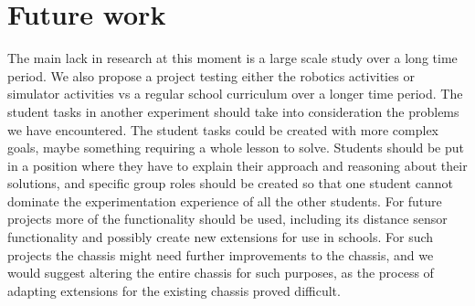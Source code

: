 \section{Future work}
The main lack in research at this moment is a large scale study over a long time period. We also propose a project testing either the robotics activities or simulator activities vs a regular school curriculum over a longer time period. 
The student tasks in another experiment should take into consideration the problems we have encountered. 
The student tasks could be created with more complex goals, maybe something requiring a whole lesson to solve. 
Students should be put in a position where they have to explain their approach and reasoning about their solutions, and specific group roles should be created so that one student cannot dominate the experimentation experience of all the other students. 
For future projects more of the \chirp functionality should be used, including its distance sensor functionality and possibly create new extensions for use in schools.
For such projects the chassis might need further improvements to the chassis, and we would suggest altering the entire chassis for such purposes, as the process of adapting extensions for the existing chassis proved difficult. 
